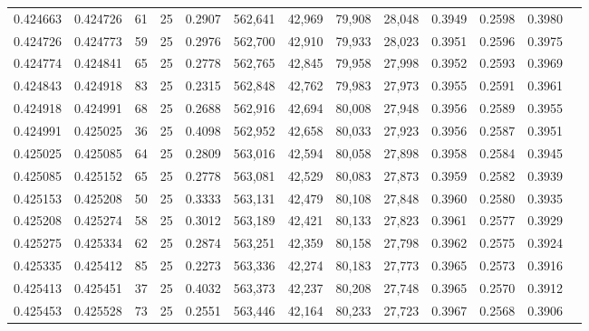 \begin{tabular}{rrrrrrrrrrrrr}
0.424663 & 0.424726 &    61 &  25 &                                     0.2907 & 562,641 &  42,969 &  79,908 &  28,048 & 0.3949 & 0.2598 & 0.3980 \\
0.424726 & 0.424773 &    59 &  25 &                                     0.2976 & 562,700 &  42,910 &  79,933 &  28,023 & 0.3951 & 0.2596 & 0.3975 \\
0.424774 & 0.424841 &    65 &  25 &                                     0.2778 & 562,765 &  42,845 &  79,958 &  27,998 & 0.3952 & 0.2593 & 0.3969 \\
0.424843 & 0.424918 &    83 &  25 &                                     0.2315 & 562,848 &  42,762 &  79,983 &  27,973 & 0.3955 & 0.2591 & 0.3961 \\
0.424918 & 0.424991 &    68 &  25 &                                     0.2688 & 562,916 &  42,694 &  80,008 &  27,948 & 0.3956 & 0.2589 & 0.3955 \\
0.424991 & 0.425025 &    36 &  25 &                                     0.4098 & 562,952 &  42,658 &  80,033 &  27,923 & 0.3956 & 0.2587 & 0.3951 \\
0.425025 & 0.425085 &    64 &  25 &                                     0.2809 & 563,016 &  42,594 &  80,058 &  27,898 & 0.3958 & 0.2584 & 0.3945 \\
0.425085 & 0.425152 &    65 &  25 &                                     0.2778 & 563,081 &  42,529 &  80,083 &  27,873 & 0.3959 & 0.2582 & 0.3939 \\
0.425153 & 0.425208 &    50 &  25 &                                     0.3333 & 563,131 &  42,479 &  80,108 &  27,848 & 0.3960 & 0.2580 & 0.3935 \\
0.425208 & 0.425274 &    58 &  25 &                                     0.3012 & 563,189 &  42,421 &  80,133 &  27,823 & 0.3961 & 0.2577 & 0.3929 \\
0.425275 & 0.425334 &    62 &  25 &                                     0.2874 & 563,251 &  42,359 &  80,158 &  27,798 & 0.3962 & 0.2575 & 0.3924 \\
0.425335 & 0.425412 &    85 &  25 &                                     0.2273 & 563,336 &  42,274 &  80,183 &  27,773 & 0.3965 & 0.2573 & 0.3916 \\
0.425413 & 0.425451 &    37 &  25 &                                     0.4032 & 563,373 &  42,237 &  80,208 &  27,748 & 0.3965 & 0.2570 & 0.3912 \\
0.425453 & 0.425528 &    73 &  25 &                                     0.2551 & 563,446 &  42,164 &  80,233 &  27,723 & 0.3967 & 0.2568 & 0.3906 \\

\end{tabular}
